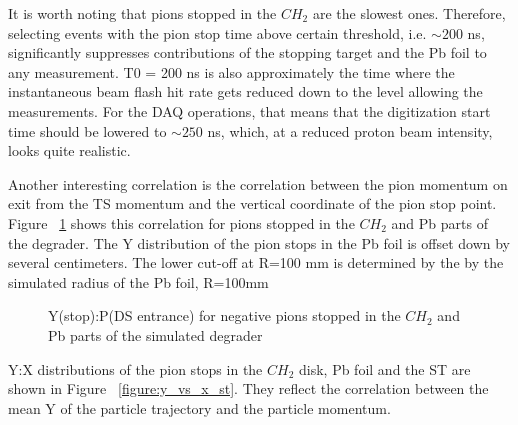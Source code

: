 It is worth noting that pions stopped in the $CH_2$ are the slowest ones.
Therefore, selecting events with the pion stop time above certain threshold, i.e. $\sim 200$ ns, 
significantly suppresses contributions of the stopping target and the Pb foil to any measurement.
T0 = 200 ns is also approximately the time where the instantaneous beam flash
hit rate gets reduced down to the level allowing the measurements. For the DAQ operations,
that means that the digitization start time should be lowered to $\sim 250$ ns,
which, at a reduced proton beam intensity, looks quite realistic.

Another interesting correlation is the correlation between the pion momentum on exit from the TS momentum
and the vertical coordinate of the pion stop point. Figure ~\ref{figure:y_vs_p_deg} shows this correlation
for pions stopped in the $CH_2$ and Pb parts of the degrader. The Y distribution of the pion stops
in the Pb foil is offset down by several centimeters. The lower cut-off at R=100 mm is determined by the
by the simulated radius of the Pb foil, R=100mm

\begin{figure}[H]
  \caption{
    \label{figure:y_vs_p_deg}
    Y(stop):P\@(DS entrance) for negative pions stopped in the $CH_2$ and Pb parts of the simulated degrader
  }
\end{figure}

Y:X distributions of the pion stops in the $CH_2$ disk, Pb foil and the ST are shown in Figure ~\ref{figure:y_vs_x_st}.
They reflect the correlation between the mean Y of the particle trajectory and the particle momentum.

